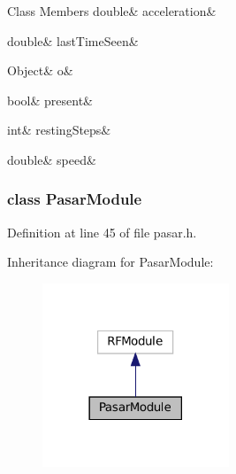 \begin{DoxyFields}{Class Members}
\mbox{\label{group__pasar_a52ec98a5bb9ea8a10113d22eb21bd16b}} 
double&
acceleration&
\\
\hline

\mbox{\label{group__pasar_ab94c4a5cd18511058abb9694e86fe073}} 
double&
lastTimeSeen&
\\
\hline

\mbox{\label{group__pasar_a0491f1d15866f477f411c652f11b222b}} 
Object&
o&
\\
\hline

\mbox{\label{group__pasar_a9ab092cc2809502ac69974bfcd107b55}} 
bool&
present&
\\
\hline

\mbox{\label{group__pasar_ab190bf59bc185f03d1f39063e49daa8a}} 
int&
restingSteps&
\\
\hline

\mbox{\label{group__pasar_a73fdba6ab7f8bde4657064dfca1c9dca}} 
double&
speed&
\\
\hline

\end{DoxyFields}
\label{classPasarModule}
\subsubsection{class Pasar\+Module}


Definition at line 45 of file pasar.\+h.



Inheritance diagram for Pasar\+Module\+:
\nopagebreak
\begin{figure}[H]
\begin{center}
\leavevmode
\includegraphics[width=158pt]{classPasarModule__inherit__graph}
\end{center}
\end{figure}
